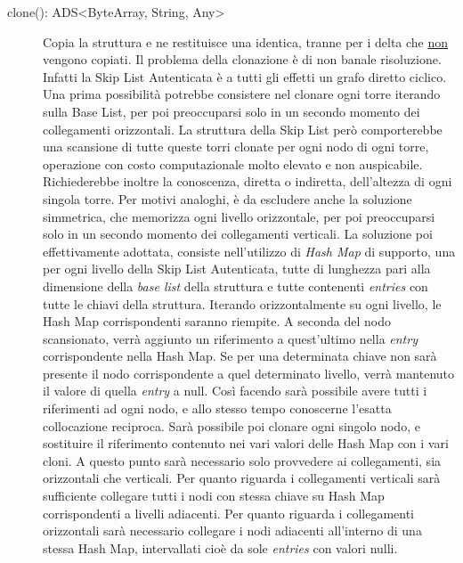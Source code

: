 \begin{description}
		\item[clone(): ADS<ByteArray, String, Any>] Copia la struttura e ne restituisce una identica, tranne per i delta che \underline{non} vengono copiati. Il problema della clonazione è di non banale risoluzione. Infatti la Skip List Autenticata è a tutti gli effetti un grafo diretto ciclico. Una prima possibilità potrebbe consistere nel clonare ogni torre iterando sulla Base List, per poi preoccuparsi solo in un secondo momento dei collegamenti orizzontali. La struttura della Skip List però comporterebbe una scansione di tutte queste torri clonate per ogni nodo di ogni torre, operazione con costo computazionale molto elevato e non auspicabile. Richiederebbe inoltre la conoscenza, diretta o indiretta, dell'altezza di ogni singola torre. 
		Per motivi analoghi, è da escludere anche la soluzione simmetrica, che memorizza ogni livello orizzontale, per poi preoccuparsi solo in un secondo momento dei collegamenti verticali.
		La soluzione poi effettivamente adottata, consiste nell'utilizzo di \textit{Hash Map} di supporto, una per ogni livello della Skip List Autenticata, tutte di lunghezza pari alla dimensione della \textit{base list} della struttura e tutte contenenti \textit{entries} con tutte le chiavi della struttura. Iterando orizzontalmente su ogni livello, le Hash Map corrispondenti saranno riempite. A seconda del nodo scansionato, verrà aggiunto un riferimento a quest'ultimo nella \textit{entry} corrispondente nella Hash Map. Se per una determinata chiave non sarà presente il nodo corrispondente a quel determinato livello, verrà mantenuto il valore di quella \textit{entry} a null. Così facendo sarà possibile avere tutti i riferimenti ad ogni nodo, e allo stesso tempo conoscerne l'esatta collocazione reciproca. Sarà possibile poi clonare ogni singolo nodo, e sostituire il riferimento contenuto nei vari valori delle Hash Map con i vari cloni. A questo punto sarà necessario solo provvedere ai collegamenti, sia orizzontali che verticali. Per quanto riguarda i collegamenti verticali sarà sufficiente collegare tutti i nodi con stessa chiave su Hash Map corrispondenti a livelli adiacenti. Per quanto riguarda i collegamenti orizzontali sarà necessario collegare i nodi adiacenti all'interno di una stessa Hash Map, intervallati cioè da sole \textit{entries} con valori nulli.
	\end{description}

